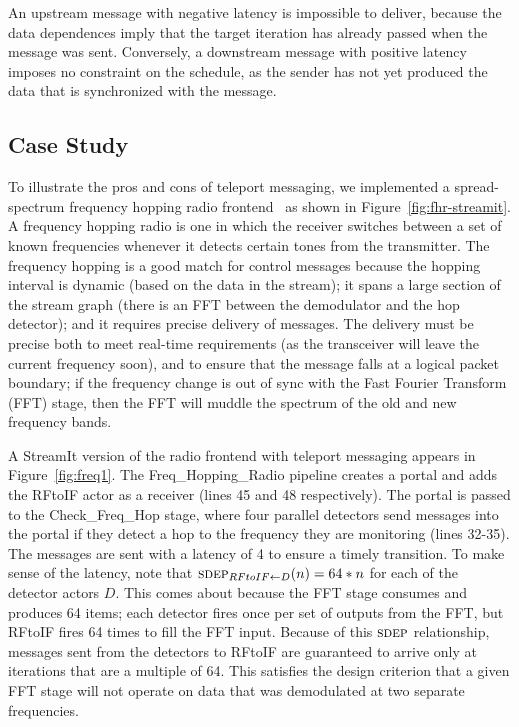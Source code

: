 An upstream message with negative latency is impossible to deliver,
because the data dependences imply that the target iteration has
already passed when the message was sent.  Conversely, a downstream
message with positive latency imposes no constraint on the schedule,
as the sender has not yet produced the data that is synchronized with
the message.

%

\subsection{Case Study}

To illustrate the pros and cons of teleport messaging, we implemented
a spread-spectrum frequency hopping radio frontend~\cite{harada02} as
shown in Figure~\ref{fig:fhr-streamit}.  A frequency hopping radio is
one in which the receiver switches between a set of known frequencies
whenever it detects certain tones from the transmitter.  The frequency
hopping is a good match for control messages because the hopping
interval is dynamic (based on the data in the stream); it spans a
large section of the stream graph (there is an FFT between the
demodulator and the hop detector); and it requires precise delivery of
messages.  The delivery must be precise both to meet real-time
requirements (as the transceiver will leave the current frequency
soon), and to ensure that the message falls at a logical packet
boundary; if the frequency change is out of sync with the Fast Fourier
Transform (FFT) stage, then the FFT will muddle the spectrum of the
old and new frequency bands.

A StreamIt version of the radio frontend with teleport messaging
appears in Figure~\ref{fig:freq1}.  The Freq\_Hopping\_Radio pipeline
creates a portal and adds the RFtoIF actor as a receiver (lines 45 and 48 respectively).  The portal
is passed to the Check\_Freq\_Hop stage, where four parallel detectors
send messages into the portal if they detect a hop to the frequency
they are monitoring (lines 32-35).  The messages are sent with a latency of 4 to
ensure a timely transition.  To make sense of the latency, note that
$\sdepf{RFtoIF}{D}(n) = 64*n$ for each of the detector actors $D$.
This comes about because the FFT stage consumes and produces 64 items;
each detector fires once per set of outputs from the FFT, but RFtoIF
fires 64 times to fill the FFT input.  Because of this $\textsc{sdep}$
relationship, messages sent from the detectors to RFtoIF are
guaranteed to arrive only at iterations that are a multiple of 64.
This satisfies the design criterion that a given FFT stage will not
operate on data that was demodulated at two separate frequencies.

